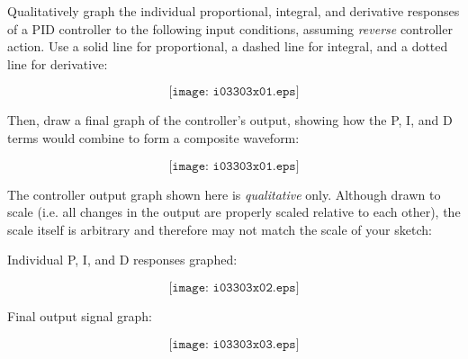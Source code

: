

Qualitatively graph the individual proportional, integral, and derivative responses of a PID controller to the following input conditions, assuming {\it reverse} controller action.  Use a solid line for proportional, a dashed line for integral, and a dotted line for derivative:

$$\texttt{[image: i03303x01.eps]}$$

Then, draw a final graph of the controller's output, showing how the P, I, and D terms would combine to form a composite waveform:

$$\texttt{[image: i03303x01.eps]}$$







The controller output graph shown here is {\it qualitative} only.  Although drawn to scale (i.e. all changes in the output are properly scaled relative to each other), the scale itself is arbitrary and therefore may not match the scale of your sketch:

\vskip 10pt

Individual P, I, and D responses graphed:

$$\texttt{[image: i03303x02.eps]}$$

Final output signal graph:

$$\texttt{[image: i03303x03.eps]}$$












